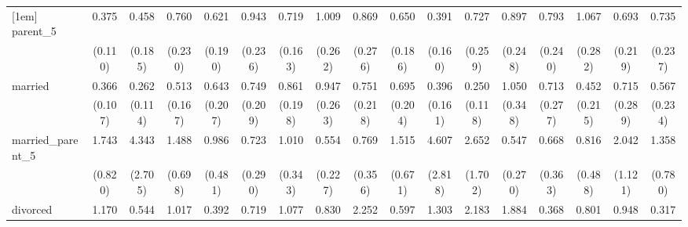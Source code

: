 {\begin{tabular}{l*{16}{c}}
[1em]
parent\_5            &       0.375\sym{***}&       0.458         &       0.760         &       0.621         &       0.943         &       0.719         &       1.009         &       0.869         &       0.650         &       0.391\sym{*}  &       0.727         &       0.897         &       0.793         &       1.067         &       0.693         &       0.735         \\
                    &     (0.110)         &     (0.185)         &     (0.230)         &     (0.190)         &     (0.236)         &     (0.163)         &     (0.262)         &     (0.276)         &     (0.186)         &     (0.160)         &     (0.259)         &     (0.248)         &     (0.240)         &     (0.282)         &     (0.219)         &     (0.237)         \\
[1em]
married             &       0.366\sym{***}&       0.262\sym{**} &       0.513\sym{*}  &       0.643         &       0.749         &       0.861         &       0.947         &       0.751         &       0.695         &       0.396\sym{*}  &       0.250\sym{**} &       1.050         &       0.713         &       0.452         &       0.715         &       0.567         \\
                    &     (0.107)         &     (0.114)         &     (0.167)         &     (0.207)         &     (0.209)         &     (0.198)         &     (0.263)         &     (0.218)         &     (0.204)         &     (0.161)         &     (0.118)         &     (0.348)         &     (0.277)         &     (0.215)         &     (0.289)         &     (0.234)         \\
[1em]
married\_parent\_5    &       1.743         &       4.343\sym{*}  &       1.488         &       0.986         &       0.723         &       1.010         &       0.554         &       0.769         &       1.515         &       4.607\sym{*}  &       2.652         &       0.547         &       0.668         &       0.816         &       2.042         &       1.358         \\
                    &     (0.820)         &     (2.705)         &     (0.698)         &     (0.481)         &     (0.290)         &     (0.343)         &     (0.227)         &     (0.356)         &     (0.671)         &     (2.818)         &     (1.702)         &     (0.270)         &     (0.363)         &     (0.488)         &     (1.121)         &     (0.780)         \\
[1em]
divorced            &       1.170         &       0.544         &       1.017         &       0.392         &       0.719         &       1.077         &       0.830         &       2.252\sym{*}  &       0.597         &       1.303         &       2.183         &       1.884         &       0.368         &       0.801         &       0.948         &       0.317         \\

\end{tabular}}
